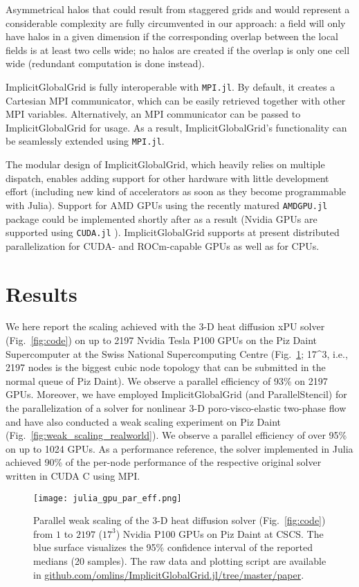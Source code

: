\documentclass{juliacon}
\begin{document}
Asymmetrical halos that could result from staggered grids and would represent a considerable complexity are fully circumvented in our approach: a field will only have halos in a given dimension if the corresponding overlap between the local fields is at least two cells wide; no halos are created if the overlap is only one cell wide (redundant computation is done instead).

ImplicitGlobalGrid is fully interoperable with \texttt{MPI.jl}. By default, it creates a Cartesian MPI communicator, which can be easily retrieved together with other MPI variables. Alternatively, an MPI communicator can be passed to ImplicitGlobalGrid for usage. As a result, ImplicitGlobalGrid's functionality can be seamlessly extended using \texttt{MPI.jl}.

The modular design of ImplicitGlobalGrid, which heavily relies on multiple dispatch, enables adding support for other hardware with little development effort (including new kind of accelerators as soon as they become programmable with Julia). Support for AMD GPUs using the recently matured \texttt{AMDGPU.jl} package \cite{amdgpu_jl} could be implemented shortly after as a result (Nvidia GPUs are supported using \texttt{CUDA.jl} \cite{besard2018effective}). ImplicitGlobalGrid supports at present distributed parallelization for CUDA- and ROCm-capable GPUs as well as for CPUs.

\section{Results}
We here report the scaling achieved with the 3-D heat diffusion xPU solver (Fig.~\ref{fig:code}) on up to 2197 Nvidia Tesla P100 GPUs on the Piz Daint Supercomputer at the Swiss National Supercomputing Centre (Fig.~\ref{fig:weak_scaling}; 17^3, i.e., 2197 nodes is the biggest cubic node topology that can be submitted in the normal queue of Piz Daint). We observe a parallel efficiency of 93\% on 2197 GPUs.
Moreover, we have employed ImplicitGlobalGrid (and ParallelStencil) for the parallelization of a solver for nonlinear 3-D poro-visco-elastic two-phase flow and have also conducted a weak scaling experiment on Piz Daint (Fig.~\ref{fig:weak_scaling_realworld}). We observe a parallel efficiency of over 95\% on up to 1024 GPUs. As a performance reference, the solver implemented in Julia achieved 90\% of the per-node performance of the respective original solver written in CUDA C using MPI.

\begin{figure}[t]
    \centerline{\texttt{[image: julia\_gpu\_par\_eff.png]}}
    \caption{Parallel weak scaling of the 3-D heat diffusion solver (Fig.~\ref{fig:code}) from $1$ to $2197$ ($17^3$) Nvidia P100 GPUs on Piz Daint at CSCS. The blue surface visualizes the 95\% confidence interval of the reported medians (20 samples). The raw data and plotting script are available in \url{github.com/omlins/ImplicitGlobalGrid.jl/tree/master/paper}.}
	\label{fig:weak_scaling}
\end{figure}
\end{document}
